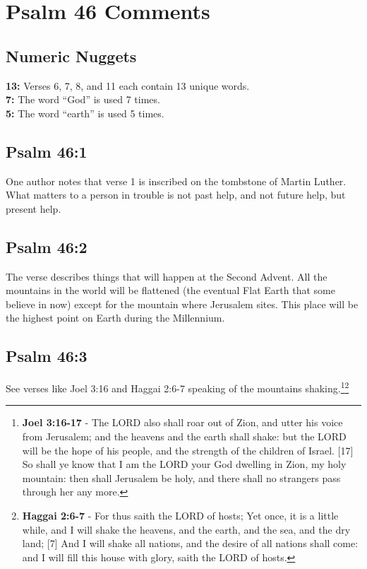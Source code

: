 \section{Psalm 46 Comments}

\subsection{Numeric Nuggets}
\textbf{13:} Verses 6, 7, 8, and 11 each contain 13 unique words.\\
\noindent \textbf{7:} The word ``God'' is used 7 times.\\
\noindent \textbf{5:} The word ``earth'' is used 5 times.



\subsection{Psalm 46:1}
One author notes that verse 1 is inscribed on the tombstone of Martin Luther.\cite{Ruckman1992PsalmsV1} What matters to a person in trouble is not past help, and not future help, but present help.
	
\subsection{Psalm 46:2}
The verse describes things that will happen at the Second Advent. All the mountains in the world will be flattened (the eventual Flat Earth that some believe in now) except for the mountain where Jerusalem sites. This place will be the highest point on Earth during the Millennium. 
	
\subsection{Psalm 46:3}
See verses like Joel 3:16 and Haggai 2:6-7 speaking of the mountains shaking.\footnote{\textbf{Joel 3:16-17} - The LORD also shall roar out of Zion, and utter his voice from Jerusalem; and the heavens and the earth shall shake: but the LORD will be the hope of his people, and the strength of the children of Israel. [17] So shall ye know that I am the LORD your God dwelling in Zion, my holy mountain: then shall Jerusalem be holy, and there shall no strangers pass through her any more.}\footnote{\textbf{Haggai 2:6-7} - For thus saith the LORD of hosts; Yet once, it is a little while, and I will shake the heavens, and the earth, and the sea, and the dry land; [7] And I will shake all nations, and the desire of all nations shall come: and I will fill this house with glory, saith the LORD of hosts.}
	
